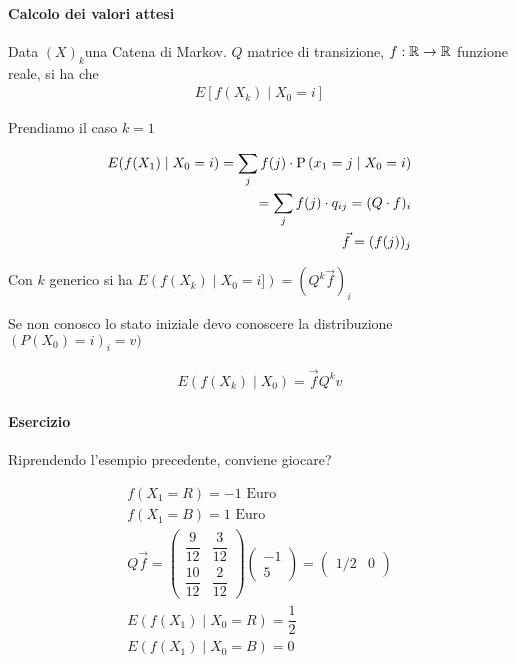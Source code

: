 \paragraph{Calcolo dei valori attesi}

Data $ (X)_k $una Catena di Markov. $ Q $ matrice di transizione, $ f : \mathbb{R} \to \mathbb{R}$ funzione reale, si ha che
\[ \begin{aligned}
E[f(X_k) \mid X_0 = i]
\end{aligned} \]

Prendiamo il caso $ k = 1 $

\[ \begin{aligned}
E(f(X_1) \mid X_0 = i) = \sum_j f(j) \cdot \text{P}\left(x_1 = j \mid X_0 = i\right) \\
= \sum_j f(j) \cdot q_{ij} = (Q \cdot f)_i \\
\vec{f} = (f(j))_j
\end{aligned} \]

Con $ k $ generico si ha $E(f(X_k) \mid X_0 = i]) = (Q^k \vec{f})_i $

Se non conosco lo stato iniziale devo conoscere la distribuzione $ (P(X_0) =i)_i = v) $

\[ \begin{aligned}
E(f(X_k) \mid X_0) = \vec{f} Q^k v
\end{aligned} \]

\paragraph{Esercizio}
Riprendendo l'esempio precedente, conviene giocare?

\[
\begin{aligned}
f(X_1 = R) = -1 \text{ Euro} \\
f(X_1 = B) = 1 \text{ Euro} \\
Q\vec{f} = \begin{pmatrix}
\dfrac{9}{12} & \dfrac{3}{12} \\
\dfrac{10}{12} & \dfrac{2}{12}
\end{pmatrix} \begin{pmatrix}
-1 \\ 5
\end{pmatrix} = \begin{pmatrix}
1/2 & 0
\end{pmatrix} \\
E(f(X_1) \mid X_0 = R) = \dfrac{1}{2} \\
E(f(X_1) \mid X_0 = B) = 0
\end{aligned} \]

